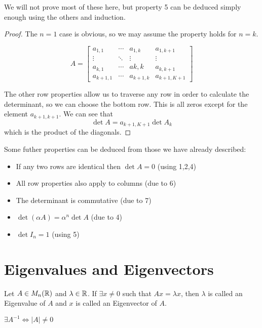 \documentclass[a4paper,10pt]{article}
\begin{document}
We will not prove most of these here, but property 5 can be deduced
simply enough using the others and induction.

\begin{proof}
The $n=1$ case is obvious, so we may assume the property holds for
$n=k$.

\[
	A =
	\begin{bmatrix}
		a_{1,1}   & \cdots & a_{1,k}   & a_{1,k+1} \\
		\vdots    & \ddots & \vdots    & \vdots    \\
		a_{k,1}   & \cdots & a{k,k}    & a_{k,k+1} \\
		a_{k+1,1} & \cdots & a_{k+1,k} & a_{k+1,K+1}
	\end{bmatrix}
\]

The other row properties allow us to traverse any row in order to
calculate the determinant, so we can choose the bottom row. This is all
zeros except for the element $a_{k+1,k+1}$. We can see that
\[
	\det A = a_{k+1,K+1} \det A_k
\]
which is the product of the diagonals.
\end{proof}

Some futher properties can be deduced from those we have already described:
\begin{itemize}
	\item
		If any two rows are identical then $\det A = 0$ (using 1,2,4)
	\item
		All row properties also apply to columns (due to 6)
	\item
		The determinant is commutative (due to 7)
	\item
		$\det(\alpha A) = \alpha^n \det A$ (due to 4)
	\item
		$\det I_n = 1$ (using 5)
\end{itemize}

\section{Eigenvalues and Eigenvectors}

\begin{defn}
	Let $A \in M_n(\mathbb{R})$ and $\lambda \in \mathbb{R}$. If $\exists x \neq
	0$ such that $Ax = \lambda x$, then $\lambda$ is called an
	Eigenvalue of $A$ and $x$ is called an Eigenvector of $A$.
\end{defn}

\begin{lemma}
	$\exists A^{-1} \iff |A| \neq 0$
\end{lemma}
\end{document}
